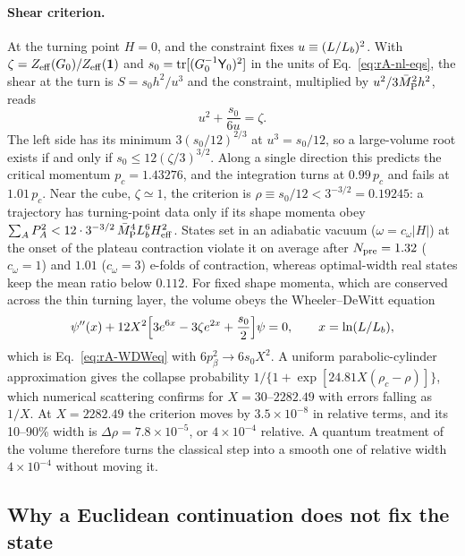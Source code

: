 \paragraph{Shear criterion.}
At the turning point $H=0$, and the constraint fixes $u\equiv(L/L_b)^2$.
With $\zeta=Z_{\rm eff}(G_0)/Z_{\rm eff}(\mathbf{1})$ and $s_0=\operatorname{tr}[(G_0^{-1}\mathsf Y_0)^2]$ in the units of Eq.~\eqref{eq:rA-nl-eqs}, the shear at the turn is $S=s_0h^2/u^3$ and the constraint, multiplied by $u^2/3\bar M_{\mathrm{P}}^2h^2$, reads
\begin{equation}
u^2+\frac{s_0}{6u}=\zeta .
\end{equation}
The left side has its minimum $3(s_0/12)^{2/3}$ at $u^3=s_0/12$, so a large-volume root exists if and only if $s_0\leq12(\zeta/3)^{3/2}$.
Along a single direction this predicts the critical momentum $p_c=1.43276$, and the integration turns at $0.99\,p_c$ and fails at $1.01\,p_c$. %
Near the cube, $\zeta\simeq1$, the criterion is $\rho\equiv s_0/12<3^{-3/2}=0.19245$: a trajectory has turning-point data only if its shape momenta obey $\sum_AP_A^2<12\cdot3^{-3/2}\,\bar M_{\mathrm{P}}^4L_b^6H_{\mathrm{eff}}^2$. %
States set in an adiabatic vacuum ($\omega=c_\omega|H|$) at the onset of the plateau contraction violate it on average after $N_{\rm pre}=1.32$ ($c_\omega=1$) and $1.01$ ($c_\omega=3$) e-folds of contraction, whereas optimal-width real states keep the mean ratio below $0.112$. %
For fixed shape momenta, which are conserved across the thin turning layer, the volume obeys the Wheeler--DeWitt equation
\begin{equation}
\psi''(x)+12X^2\Big[3e^{6x}-3\zeta e^{2x}+\frac{s_0}2\Big]\psi=0,\qquad x=\ln(L/L_b),
\end{equation}
which is Eq.~\eqref{eq:rA-WDWeq} with $6p_\beta^2\to6s_0X^2$.
A uniform parabolic-cylinder approximation gives the collapse probability $1/\{1+\exp[24.81X(\rho_c-\rho)]\}$, which numerical scattering confirms for $X=30$--$2282.49$ with errors falling as $1/X$. %
At $X=2282.49$ the criterion moves by $3.5\times10^{-8}$ in relative terms, and its 10--90\% width is $\Delta\rho=7.8\times10^{-5}$, or $4\times10^{-4}$ relative. %
A quantum treatment of the volume therefore turns the classical step into a smooth one of relative width $4\times10^{-4}$ without moving it. %

\subsection{Why a Euclidean continuation does not fix the state}
\label{rA:s-euclid}

